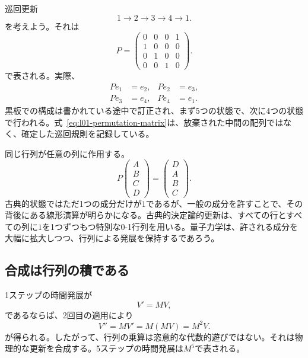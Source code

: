 巡回更新
\begin{equation}
  1\longrightarrow2\longrightarrow3\longrightarrow4\longrightarrow1.
  \label{eq:l01-four-cycle}
\end{equation}
を考えよう。それは
\begin{equation}
  P=
  \begin{pmatrix}
    0&0&0&1\\
    1&0&0&0\\
    0&1&0&0\\
    0&0&1&0
  \end{pmatrix}.
  \label{eq:l01-permutation-matrix}
\end{equation}
で表される。実際、
\begin{equation}
  \begin{aligned}
    Pe_1&=e_2, & Pe_2&=e_3,\\
    Pe_3&=e_4, & Pe_4&=e_1.
  \end{aligned}
\end{equation}
黒板での構成は書かれている途中で訂正され、まず5つの状態で、次に4つの状態で行われる。式~\eqref{eq:l01-permutation-matrix}は、放棄された中間の配列ではなく、確定した巡回規則を記録している。

同じ行列が任意の列に作用する。
\begin{equation}
  P
  \begin{pmatrix}A\\B\\C\\D\end{pmatrix}
  =
  \begin{pmatrix}D\\A\\B\\C\end{pmatrix}.
  \label{eq:l01-cyclic-shift}
\end{equation}
古典的状態ではただ1つの成分だけが\(1\)であるが、一般の成分を許すことで、その背後にある線形演算が明らかになる。古典的決定論的更新は、すべての行とすべての列に\(1\)を1つずつもつ特別な0-1行列を用いる。量子力学は、許される成分を大幅に拡大しつつ、行列による発展を保持するであろう。

\subsection{合成は行列の積である}

1ステップの時間発展が
\begin{equation}
  V'=MV,
\end{equation}
であるならば、2回目の適用により
\begin{equation}
  V''=MV'=M(MV)=M^2V.
  \label{eq:l01-two-updates}
\end{equation}
が得られる。したがって、行列の乗算は恣意的な代数的遊びではない。それは物理的な更新を合成する。5ステップの時間発展は\(M^5\)で表される。

